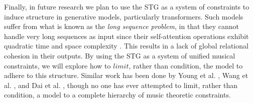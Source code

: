 \documentclass{article}
\begin{document}
Finally, in future research we plan to use the STG as a system of constraints to induce structure in generative models, particularly transformers. Such models suffer from what is known as the \textit{long sequence problem}, in that they cannot handle very long sequences as input since their self-attention operations exhibit quadratic time and space complexity \cite{mao2024iceformer}. This results in a lack of global relational cohesion in their outputs. By using the STG as a system of unified musical constraints, we will explore how to $limit$, rather than condition, the model to adhere to this structure. Similar work has been done by Young et al. \cite{young_2022}, Wang et al. \cite{wang2024wholesong}, and Dai et al. \cite{musicframeworks}, though no one has ever attempted to limit, rather than condition, a model to a complete hierarchy of music theoretic constraints. 







%
%
%
%
%
\end{document}
